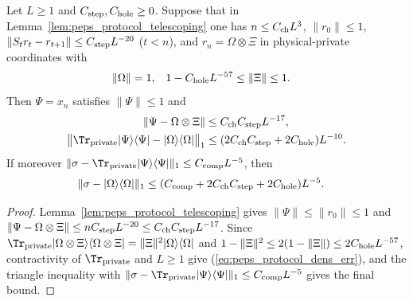 \begin{lemma}
    \label{thm:peps_protocol_density}
    \leanok
    Let $L\geq1$ and $C_{\rm step},C_{\rm hole}\geq0$. Suppose that in Lemma~\ref{lem:peps_protocol_telescoping} one has $n\leq C_{\rm ch}L^3$, $\lVert r_0\rVert\leq1$, $\lVert S_tr_t-r_{t+1}\rVert\leq C_{\rm step}L^{-20}$ ($t<n$), and $r_n=\Omega\otimes\Xi$ in physical-private coordinates with
    \begin{align}
        \lVert\Omega\rVert                       & =1,    &
        1-C_{\rm hole}L^{-57}\leq\lVert\Xi\rVert & \leq1.
    \end{align}
    Then $\Psi=x_n$ satisfies $\lVert\Psi\rVert\leq1$ and
    \begin{align}
        \lVert\Psi-\Omega\otimes\Xi\rVert & \leq C_{\rm ch}C_{\rm step}L^{-17}, \label{eq:peps_protocol_vec_err}                  \\
        \big\lVert\Tr_{\rm private}|\Psi\rangle\langle\Psi|
        -|\Omega\rangle\langle\Omega|\big\rVert_1
                                          & \leq(2C_{\rm ch}C_{\rm step}+2C_{\rm hole})L^{-10}. \label{eq:peps_protocol_dens_err}
    \end{align}
    If moreover $\lVert\sigma-\Tr_{\rm private}|\Psi\rangle\langle\Psi|\rVert_1\leq C_{\rm comp}L^{-5}$, then
    \begin{align}
        \lVert\sigma-|\Omega\rangle\langle\Omega|\rVert_1
         & \leq(C_{\rm comp}+2C_{\rm ch}C_{\rm step}+2C_{\rm hole})L^{-5}.
    \end{align}
\end{lemma}

\begin{proof}\leanok
    Lemma~\ref{lem:peps_protocol_telescoping} gives $\lVert\Psi\rVert\le\lVert r_0\rVert\le1$ and $\lVert\Psi-\Omega\otimes\Xi\rVert\le nC_{\rm step}L^{-20}\le C_{\rm ch}C_{\rm step}L^{-17}$. Since $\Tr_{\rm private}|\Omega\otimes\Xi\rangle\langle\Omega\otimes\Xi|=\lVert\Xi\rVert^2|\Omega\rangle\langle\Omega|$ and $1-\lVert\Xi\rVert^2\le 2(1-\lVert\Xi\rVert)\le 2C_{\rm hole}L^{-57}$, contractivity of $\Tr_{\rm private}$ and $L\ge1$ give (\ref{eq:peps_protocol_dens_err}), and the triangle inequality with $\lVert\sigma-\Tr_{\rm private}|\Psi\rangle\langle\Psi|\rVert_1\le C_{\rm comp}L^{-5}$ gives the final bound.
\end{proof}

